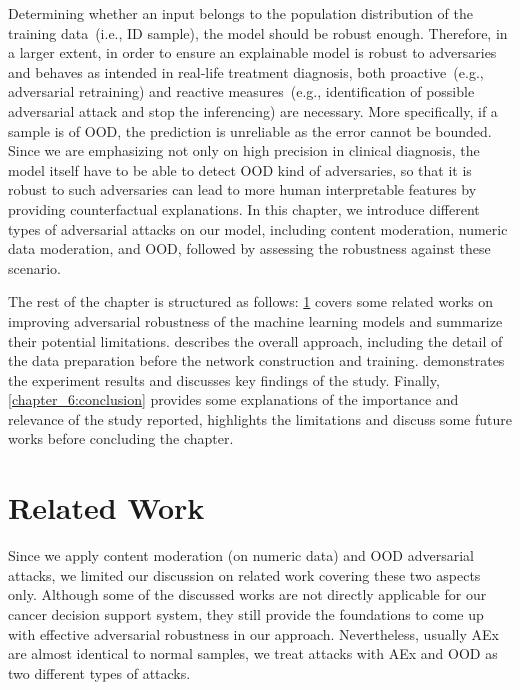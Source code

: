 \hspace*{3.5mm} Determining whether an input belongs to the population distribution of the training data~(i.e., ID sample), the model should be robust enough. Therefore, in a larger extent, in order to ensure an explainable model is robust to adversaries and behaves as intended in real-life treatment diagnosis, both proactive~(e.g., adversarial retraining) and reactive measures~(e.g., identification of possible adversarial attack and stop the inferencing) are necessary. More specifically, if a sample is of OOD, the prediction is unreliable as the error cannot be bounded. Since we are emphasizing not only on high precision in clinical diagnosis, the model itself have to be able to detect OOD kind of adversaries, so that it is robust to such adversaries can lead to more human interpretable features by providing counterfactual explanations. 
In this chapter, we introduce different types of adversarial attacks on our model, including content moderation, numeric data moderation, and OOD, followed by assessing the robustness against these scenario. 

\hspace*{3.5mm} The rest of the chapter is structured as follows: \cref{chapter_6:rw} covers some related works on improving adversarial robustness of the machine learning models and summarize their potential limitations.  describes the overall approach, including the detail of the data preparation before the network construction and training.  demonstrates the experiment results and discusses key findings of the study. Finally, \cref{chapter_6:conclusion} provides some explanations of the importance and relevance of the study reported, highlights the limitations and discuss some future works before concluding the chapter. 

\section{Related Work} \label{chapter_6:rw}
Since we apply content moderation (on numeric data) and OOD adversarial attacks, we limited our discussion on related work covering these two aspects only. Although some of the discussed works are not directly applicable for our cancer decision support system, they still provide the foundations to come up with effective adversarial robustness in our approach. Nevertheless, usually AEx are almost identical to normal samples, we treat attacks with AEx and OOD as two different types of attacks. 

